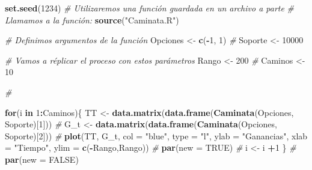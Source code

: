 \documentclass[
]{book}
\newenvironment{Shaded}{\begin{snugshade}}{\end{snugshade}}
\newcommand{\AttributeTok}[1]{\textcolor[rgb]{0.13,0.29,0.53}{#1}}
\newcommand{\CommentTok}[1]{\textcolor[rgb]{0.56,0.35,0.01}{\textit{#1}}}
\newcommand{\ConstantTok}[1]{\textcolor[rgb]{0.56,0.35,0.01}{#1}}
\newcommand{\ControlFlowTok}[1]{\textcolor[rgb]{0.13,0.29,0.53}{\textbf{#1}}}
\newcommand{\DecValTok}[1]{\textcolor[rgb]{0.00,0.00,0.81}{#1}}
\newcommand{\FunctionTok}[1]{\textcolor[rgb]{0.13,0.29,0.53}{\textbf{#1}}}
\newcommand{\NormalTok}[1]{#1}
\newcommand{\OtherTok}[1]{\textcolor[rgb]{0.56,0.35,0.01}{#1}}
\newcommand{\SpecialCharTok}[1]{\textcolor[rgb]{0.81,0.36,0.00}{\textbf{#1}}}
\newcommand{\StringTok}[1]{\textcolor[rgb]{0.31,0.60,0.02}{#1}}
\begin{document}
\begin{Shaded}
\begin{Highlighting}[]
\FunctionTok{set.seed}\NormalTok{(}\DecValTok{1234}\NormalTok{)}
\CommentTok{\# Utilizaremos una función guardada en un archivo a parte}
\CommentTok{\# Llamamos a la función:}
\FunctionTok{source}\NormalTok{(}\StringTok{"Caminata.R"}\NormalTok{)}

\CommentTok{\# Definimos argumentos de la función}
\NormalTok{Opciones }\OtherTok{\textless{}{-}} \FunctionTok{c}\NormalTok{(}\SpecialCharTok{{-}}\DecValTok{1}\NormalTok{, }\DecValTok{1}\NormalTok{)}
\CommentTok{\#}
\NormalTok{Soporte }\OtherTok{\textless{}{-}} \DecValTok{10000}

\CommentTok{\# Vamos a réplicar el proceso con estos parámetros}
\NormalTok{Rango }\OtherTok{\textless{}{-}} \DecValTok{200}
\CommentTok{\#}
\NormalTok{Caminos }\OtherTok{\textless{}{-}} \DecValTok{10}

\CommentTok{\#}

\ControlFlowTok{for}\NormalTok{(i }\ControlFlowTok{in} \DecValTok{1}\SpecialCharTok{:}\NormalTok{Caminos)\{}
\NormalTok{  TT }\OtherTok{\textless{}{-}} \FunctionTok{data.matrix}\NormalTok{(}\FunctionTok{data.frame}\NormalTok{(}\FunctionTok{Caminata}\NormalTok{(Opciones, Soporte)[}\DecValTok{1}\NormalTok{]))}
  \CommentTok{\#}
\NormalTok{  G\_t }\OtherTok{\textless{}{-}} \FunctionTok{data.matrix}\NormalTok{(}\FunctionTok{data.frame}\NormalTok{(}\FunctionTok{Caminata}\NormalTok{(Opciones, Soporte)[}\DecValTok{2}\NormalTok{]))}
  \CommentTok{\#}
  \FunctionTok{plot}\NormalTok{(TT, G\_t, }\AttributeTok{col =} \StringTok{"blue"}\NormalTok{, }\AttributeTok{type =} \StringTok{"l"}\NormalTok{, }\AttributeTok{ylab =} \StringTok{"Ganancias"}\NormalTok{, }
       \AttributeTok{xlab =} \StringTok{"Tiempo"}\NormalTok{, }\AttributeTok{ylim =} \FunctionTok{c}\NormalTok{(}\SpecialCharTok{{-}}\NormalTok{Rango,Rango))}
  \CommentTok{\#}
  \FunctionTok{par}\NormalTok{(}\AttributeTok{new =} \ConstantTok{TRUE}\NormalTok{)}
  \CommentTok{\#}
\NormalTok{  i }\OtherTok{\textless{}{-}}\NormalTok{ i }\SpecialCharTok{+}\DecValTok{1}
\NormalTok{\}}
\CommentTok{\#}
\FunctionTok{par}\NormalTok{(}\AttributeTok{new =} \ConstantTok{FALSE}\NormalTok{)}
\end{Highlighting}
\end{Shaded}
\end{document}
